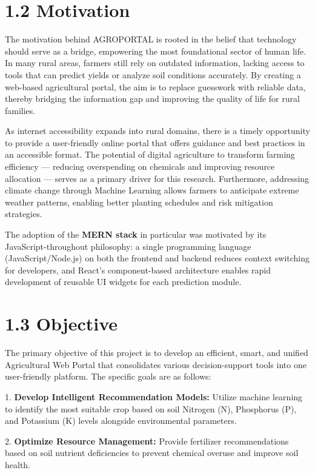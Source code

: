 \documentclass[12pt,a4paper]{report}
\begin{document}
\section{1.2 Motivation}

The motivation behind AGROPORTAL is rooted in the belief that technology should serve as a bridge, empowering the most foundational sector of human life. In many rural areas, farmers still rely on outdated information, lacking access to tools that can predict yields or analyze soil conditions accurately. By creating a web-based agricultural portal, the aim is to replace guesswork with reliable data, thereby bridging the information gap and improving the quality of life for rural families.

As internet accessibility expands into rural domains, there is a timely opportunity to provide a user-friendly online portal that offers guidance and best practices in an accessible format. The potential of digital agriculture to transform farming efficiency — reducing overspending on chemicals and improving resource allocation — serves as a primary driver for this research. Furthermore, addressing climate change through Machine Learning allows farmers to anticipate extreme weather patterns, enabling better planting schedules and risk mitigation strategies.

The adoption of the \textbf{MERN stack} in particular was motivated by its JavaScript-throughout philosophy: a single programming language (JavaScript/Node.js) on both the frontend and backend reduces context switching for developers, and React's component-based architecture enables rapid development of reusable UI widgets for each prediction module.

\section{1.3 Objective}

The primary objective of this project is to develop an efficient, smart, and unified Agricultural Web Portal that consolidates various decision-support tools into one user-friendly platform. The specific goals are as follows:

1. \textbf{Develop Intelligent Recommendation Models:} Utilize machine learning to identify the most suitable crop based on soil Nitrogen (N), Phosphorus (P), and Potassium (K) levels alongside environmental parameters.

2. \textbf{Optimize Resource Management:} Provide fertilizer recommendations based on soil nutrient deficiencies to prevent chemical overuse and improve soil health.
\end{document}
